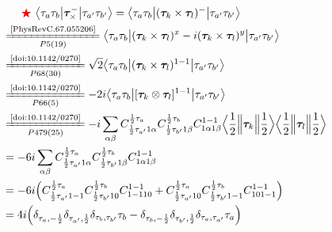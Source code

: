 \documentclass[master]{shnuthesis}
\newcommand{\ap}{a^\prime}
\newcommand{\bp}{b^\prime}
\newcommand{\il}{\!\!\!\!\!\!\!\!\!\!}
\newcommand{\zdydh}{\xlongequal}
\newcommand{\redstar}{{\color{red} \bigstar}\,\,}
\begin{document}
\begin{align}
    & \redstar \big\langle \tau_a\tau_b \big|\bm{\tau}_\times^- \big|\tau_{\ap}\tau_{\bp}\big\rangle = \big\langle \tau_a\tau_b \big| (\bm{\tau}_k \times \bm{\tau}_l)^- \big|\tau_{\ap}\tau_{\bp}\big\rangle \notag\\
    &\il \zdydh[P5(19)]{\text{\cite{PhysRevC.67.055206}}} \big\langle \tau_a\tau_b \big| (\bm{\tau}_k \times \bm{\tau}_l)^x - i(\bm{\tau}_k \times \bm{\tau}_l)^y \big|\tau_{\ap}\tau_{\bp}\big\rangle \\
    &\il \zdydh[P68(30)]{\text{\cite{doi:10.1142/0270}}} \sqrt{2}\big\langle \tau_a\tau_b \big| (\bm{\tau}_k \times \bm{\tau}_l)^{1-1} \big|\tau_{\ap}\tau_{\bp}\big\rangle \\
    &\il \zdydh[P66(5)]{\text{\cite{doi:10.1142/0270}}} -2i\big\langle \tau_a\tau_b \big| [\bm{\tau}_k \otimes \bm{\tau}_l]^{1-1} \big|\tau_{\ap}\tau_{\bp}\big\rangle \\
    &\il \zdydh[P479(25)]{\text{\cite{doi:10.1142/0270}}} -i \sum_{\alpha\beta}C_{\frac{1}{2} \tau_{\ap} 1 \alpha}^{\frac{1}{2} \tau_a} C_{\frac{1}{2} \tau_{\bp} 1 \beta}^{\frac{1}{2} \tau_b}C_{1 \alpha 1 \beta}^{1 -1} \Big\langle \frac{1}{2} \Big\| \bm{\tau}_k \Big\| \frac{1}{2} \Big\rangle \Big\langle \frac{1}{2} \Big\| \bm{\tau}_l \Big\| \frac{1}{2} \Big\rangle \\
    &\il = -6i \sum_{\alpha\beta}C_{\frac{1}{2} \tau_{\ap} 1 \alpha}^{\frac{1}{2} \tau_a} C_{\frac{1}{2} \tau_{\bp} 1 \beta}^{\frac{1}{2} \tau_b}C_{1 \alpha 1 \beta}^{1 -1} \\
    &\il = -6i \Big( C_{\frac{1}{2} \tau_{\ap} 1 -1}^{\frac{1}{2} \tau_a} C_{\frac{1}{2} \tau_{\bp} 1 0}^{\frac{1}{2} \tau_b}C_{1 -1 1 0}^{1 -1} + C_{\frac{1}{2} \tau_{\ap} 1 0}^{\frac{1}{2} \tau_a} C_{\frac{1}{2} \tau_{\bp} 1 -1}^{\frac{1}{2} \tau_b}C_{1 0 1 -1}^{1 -1} \Big) \\
    &\il = 4i \Big( \delta_{\tau_a,-\frac{1}{2}}\delta_{\tau_{\ap},\frac{1}{2}}\delta_{\tau_b,\tau_{\bp}}\tau_b - \delta_{\tau_b,-\frac{1}{2}}\delta_{\tau_{\bp},\frac{1}{2}}\delta_{\tau_a,\tau_{\ap}}\tau_a \Big) \label{tau-cha-}
\end{align}
\end{document}
